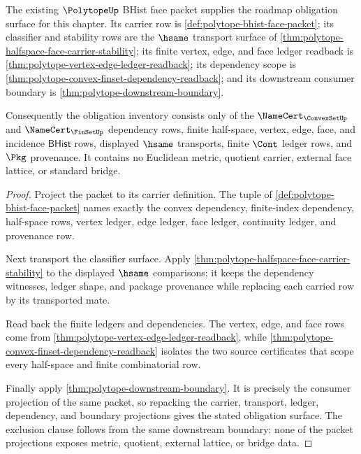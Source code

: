 \begin{theorem}
\label{thm:polytope-obligation-surface}
The existing $\PolytopeUp$ BHist face packet supplies the roadmap obligation
surface for this chapter. Its carrier row is
\autoref{def:polytope-bhist-face-packet}; its classifier and stability rows are
the $\hsame$ transport surface of
\autoref{thm:polytope-halfspace-face-carrier-stability}; its finite vertex,
edge, and face ledger readback is
\autoref{thm:polytope-vertex-edge-ledger-readback}; its dependency scope is
\autoref{thm:polytope-convex-finset-dependency-readback}; and its downstream
consumer boundary is \autoref{thm:polytope-downstream-boundary}.

Consequently the obligation inventory consists only of the
$\NameCert_{\ConvexSetUp}$ and $\NameCert_{\FinSetUp}$ dependency rows, finite
half-space, vertex, edge, face, and incidence $\mathsf{BHist}$ rows, displayed
$\hsame$ transports, finite $\Cont$ ledger rows, and $\Pkg$ provenance. It
contains no Euclidean metric, quotient carrier, external face lattice, or
standard bridge.
\end{theorem}
\begin{proof}
Project the packet to its carrier definition. The tuple of
\autoref{def:polytope-bhist-face-packet} names exactly the convex dependency,
finite-index dependency, half-space rows, vertex ledger, edge ledger, face
ledger, continuity ledger, and provenance row.

Next transport the classifier surface. Apply
\autoref{thm:polytope-halfspace-face-carrier-stability} to the displayed
$\hsame$ comparisons; it keeps the dependency witnesses, ledger shape, and
package provenance while replacing each carried row by its transported mate.

Read back the finite ledgers and dependencies. The vertex, edge, and face rows
come from \autoref{thm:polytope-vertex-edge-ledger-readback}, while
\autoref{thm:polytope-convex-finset-dependency-readback} isolates the two
source certificates that scope every half-space and finite combinatorial row.

Finally apply \autoref{thm:polytope-downstream-boundary}. It is precisely the
consumer projection of the same packet, so repacking the carrier, transport,
ledger, dependency, and boundary projections gives the stated obligation
surface. The exclusion clause follows from the same downstream boundary: none
of the packet projections exposes metric, quotient, external lattice, or bridge
data.
\end{proof}

